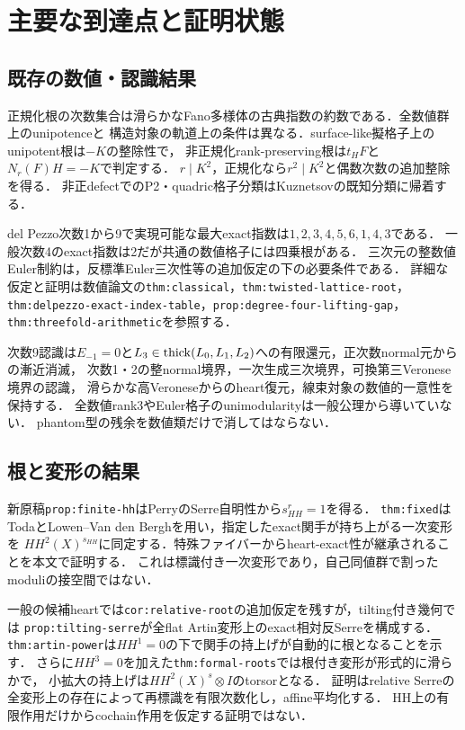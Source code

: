 \documentclass[11pt,a4paper]{ltjsarticle}
\begin{document}
\section{主要な到達点と証明状態}
\subsection{既存の数値・認識結果}
正規化根の次数集合は滑らかなFano多様体の古典指数の約数である．全数値群上のunipotenceと
構造対象の軌道上の条件は異なる．surface-like擬格子上のunipotent根は$-K$の整除性で，
非正規化rank-preserving根は$t_HF$と$N_r(F)H=-K$で判定する．
$r\mid K^2$，正規化なら$r^2\mid K^2$と偶数次数の追加整除を得る．
非正defectでのP2・quadric格子分類はKuznetsovの既知分類に帰着する．

del Pezzo次数1から9で実現可能な最大exact指数は$1,2,3,4,5,6,1,4,3$である．
一般次数4のexact指数は2だが共通の数値格子には四乗根がある．
三次元の整数値Euler制約は，反標準Euler三次性等の追加仮定の下の必要条件である．
詳細な仮定と証明は数値論文の\texttt{thm:classical}，\texttt{thm:twisted-lattice-root}，
\texttt{thm:delpezzo-exact-index-table}，\texttt{prop:degree-four-lifting-gap}，\texttt{thm:threefold-arithmetic}を参照する．

次数9認識は$E_{-1}=0$と$L_3\in\operatorname{thick}(L_0,L_1,L_2)$への有限還元，正次数normal元からの漸近消滅，
次数1・2の整normal境界，一次生成三次境界，可換第三Veronese境界の認識，
滑らかな高Veroneseからのheart復元，線束対象の数値的一意性を保持する．
全数値rank3やEuler格子のunimodularityは一般公理から導いていない．
phantom型の残余を数値類だけで消してはならない．

\subsection{根と変形の結果}
新原稿\texttt{prop:finite-hh}はPerryのSerre自明性から$s_{HH}^r=1$を得る．
\texttt{thm:fixed}はTodaとLowen--Van den Berghを用い，指定したexact関手が持ち上がる一次変形を
$HH^2(X)^{s_{HH}}$に同定する．特殊ファイバーからheart-exact性が継承されることを本文で証明する．
これは標識付き一次変形であり，自己同値群で割ったmoduliの接空間ではない．

一般の候補heartでは\texttt{cor:relative-root}の追加仮定を残すが，tilting付き幾何では
\texttt{prop:tilting-serre}が全flat Artin変形上のexact相対反Serreを構成する．
\texttt{thm:artin-power}は$HH^1=0$の下で関手の持上げが自動的に根となることを示す．
さらに$HH^3=0$を加えた\texttt{thm:formal-roots}では根付き変形が形式的に滑らかで，
小拡大の持上げは$HH^2(X)^s\otimes I$のtorsorとなる．
証明はrelative Serreの全変形上の存在によって再標識を有限次数化し，affine平均化する．
HH上の有限作用だけからcochain作用を仮定する証明ではない．
\end{document}
